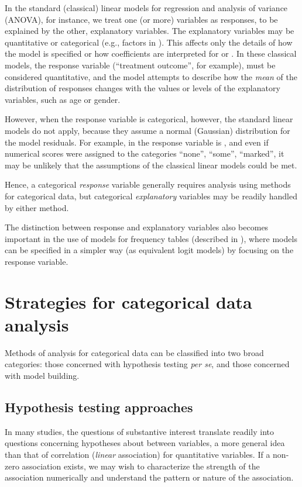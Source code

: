 \documentclass[11pt]{book}\usepackage[]{graphicx}\usepackage[]{color}
\begin{document}
In the standard (classical) linear models for regression and analysis of variance
(ANOVA), for instance, we treat one (or more) variables as responses,
to be explained by the other, explanatory variables.
The explanatory variables may be quantitative or categorical
(e.g., factors in \R). 
This affects only the details of how the model is specified
or how coefficients are interpreted for
 or .  In these classical models,
the response variable (``treatment outcome'', for example), must be
considered quantitative,  and the model attempts to describe how the
\emph{mean} of the distribution of responses changes with the values
or levels of the explanatory variables, such as age or gender.

However, when the response variable is categorical, however, the standard linear
models do not apply, because they assume a normal (Gaussian) distribution
for the model residuals.  For example, in  
the response variable
is , and even if numerical scores were assigned
to the categories ``none'', ``some'', ``marked'', it may be unlikely
that the assumptions of the classical linear models could be met.

Hence, a categorical \emph{response} variable generally requires analysis
using methods for categorical data, but categorical \emph{explanatory} variables
may be readily handled by either method.

The distinction between response and explanatory variables also
becomes important in the use of \loglin models for frequency tables
(described in ), where models can be specified
in a simpler way (as equivalent logit models) by focusing on the response
variable.


\section{Strategies for categorical data analysis}\label{sec:strategies}

Methods of analysis for categorical data can be classified into two
broad categories:
those concerned with hypothesis testing \emph{per se}, and those concerned with model building.

\subsection{Hypothesis testing approaches}\label{sec:strategies-hyp}
In many studies, the questions of substantive interest translate readily
into questions concerning hypotheses about  between variables, a more general idea than that of correlation 
(\emph{linear} association) for quantitative variables.
If a non-zero association exists, we may wish to characterize the
strength of the association numerically and understand the pattern or
nature of the association.
\end{document}
